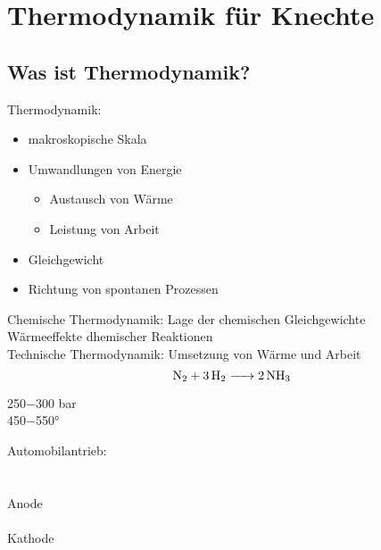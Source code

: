 \documentclass[a4paper]{article}
\begin{document}
\tableofcontents
\newpage
\section{Thermodynamik für Knechte}
\subsection{Was ist Thermodynamik?}
Thermodynamik:
\begin{itemize}
    \item makroskopische Skala
    \item Umwandlungen von Energie
    \begin{itemize}
        \item Austausch von Wärme
        \item Leistung von Arbeit
    \end{itemize}
    \item Gleichgewicht
    \item Richtung von spontanen Prozessen
\end{itemize}
Chemische Thermodynamik: Lage der chemischen Gleichgewichte\\
\hspace*{1cm} Wärmeeffekte dhemischer Reaktionen\\
Technische Thermodynamik: Umsetzung von Wärme und Arbeit\\
\begin{equation*}
    \ce{N2 + 3H2 -> 2NH3}    
\end{equation*}
\begin{center}
    250$-$300 bar\\
    450$-$550°
\end{center}
 Automobilantrieb:\\
\\
\\
Anode\\
\hspace*{1cm} \\
Kathode\\
\hspace*{1cm} \\
\end{document}
